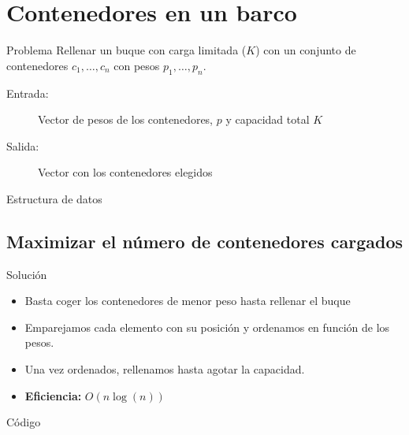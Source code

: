 \section{Contenedores en un barco}

\begin{frame}{Problema}
Rellenar un buque con carga limitada ($K$) con un conjunto
de contenedores $c_1,\dots, c_n$ con pesos $p_1, \dots, p_n$.

\begin{description}
 \item[Entrada:] Vector de pesos de los contenedores, $p$ y capacidad total $K$
 \item[Salida:] Vector con los contenedores elegidos
\end{description}
\end{frame}

\begin{frame}[fragile]{Estructura de datos}

\end{frame}

\subsection{Maximizar el número de contenedores cargados}

\begin{frame}{Solución}
\begin{itemize}
  \item Basta coger los contenedores de menor peso hasta rellenar el buque
  \item Emparejamos cada elemento con su posición y ordenamos en función de los pesos.
  \item Una vez ordenados, rellenamos hasta agotar la capacidad.
  \item \textbf{Eficiencia:} $O(n\log(n))$
\end{itemize}
\end{frame}

\begin{frame}[fragile]{Código}

\end{frame}

